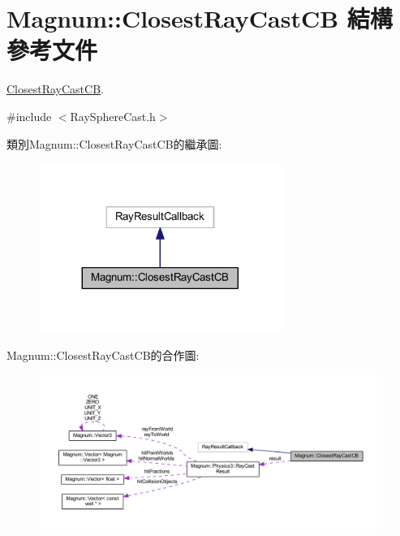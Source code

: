 \hypertarget{struct_magnum_1_1_closest_ray_cast_c_b}{}\section{Magnum\+:\+:Closest\+Ray\+Cast\+CB 結構 參考文件}
\label{struct_magnum_1_1_closest_ray_cast_c_b}


\hyperlink{struct_magnum_1_1_closest_ray_cast_c_b}{Closest\+Ray\+Cast\+CB}.  




{\ttfamily \#include $<$Ray\+Sphere\+Cast.\+h$>$}



類別\+Magnum\+:\+:Closest\+Ray\+Cast\+C\+B的繼承圖\+:\nopagebreak
\begin{figure}[H]
\begin{center}
\leavevmode
\includegraphics[width=224pt]{struct_magnum_1_1_closest_ray_cast_c_b__inherit__graph}
\end{center}
\end{figure}


Magnum\+:\+:Closest\+Ray\+Cast\+C\+B的合作圖\+:\nopagebreak
\begin{figure}[H]
\begin{center}
\leavevmode
\includegraphics[width=350pt]{struct_magnum_1_1_closest_ray_cast_c_b__coll__graph}
\end{center}
\end{figure}
